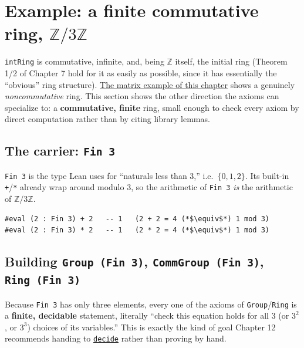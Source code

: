 \section{\texorpdfstring{Example: a finite commutative ring, \(\mathbb{Z}/3\mathbb{Z}\)}{Example: a finite commutative ring, \textbackslash mathbb\{Z\}/3\textbackslash mathbb\{Z\}}}\label{sec:08-rings:05-finite-ring-example:1}

\texttt{intRing} is commutative, infinite, and, being \(\mathbb{Z}\) itself, the initial ring (Theorem 1/2 of Chapter 7 hold for it as easily as possible, since it has essentially the ``obvious'' ring structure). \hyperref[sec:08-rings:07-matrices:1]{The matrix example of this chapter} shows a genuinely \emph{noncommutative} ring. This section shows the other direction the axioms can specialize to: a \textbf{commutative, finite} ring, small enough to check every axiom by direct computation rather than by citing library lemmas.

\subsection{\texorpdfstring{The carrier: \texttt{Fin\ 3}}{The carrier: Fin 3}}\label{sec:08-rings:05-finite-ring-example:2}

\texttt{Fin 3} is the type Lean uses for ``naturals less than 3,'' i.e.~\(\{0, 1, 2\}\). Its built-in \texttt{+}/\texttt{*} already wrap around modulo 3, so the arithmetic of \texttt{Fin 3} \emph{is} the arithmetic of \(\mathbb{Z}/3\mathbb{Z}\).

\begin{lstlisting}
#eval (2 : Fin 3) + 2   -- 1   (2 + 2 = 4 (*$\equiv$*) 1 mod 3)
#eval (2 : Fin 3) * 2   -- 1   (2 * 2 = 4 (*$\equiv$*) 1 mod 3)
\end{lstlisting}

\subsection{\texorpdfstring{Building \texttt{Group\ (Fin\ 3)}, \texttt{CommGroup\ (Fin\ 3)}, \texttt{Ring\ (Fin\ 3)}}{Building Group (Fin 3), CommGroup (Fin 3), Ring (Fin 3)}}\label{sec:08-rings:05-finite-ring-example:3}

Because \texttt{Fin 3} has only three elements, every one of the axioms of \texttt{Group}/\texttt{Ring} is a \textbf{finite, decidable} statement, literally ``check this equation holds for all \(3\) (or \(3^2\), or \(3^3\)) choices of its variables.'' This is exactly the kind of goal Chapter 12 recommends handing to \href{https://lean-lang.org/doc/reference/latest/Tactic-Proofs/Tactic-Reference/}{\texttt{decide}} rather than proving by hand.

